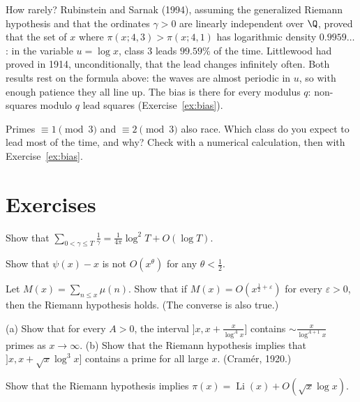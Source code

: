 How rarely? Rubinstein and Sarnak (1994), assuming the generalized Riemann hypothesis and that the ordinates $\gamma>0$ are linearly independent over $\Q$, proved that the set of $x$ where
$\pi(x;4,3)>\pi(x;4,1)$ has logarithmic density $0.9959\ldots$: in the variable $u=\log x$, class $3$ leads $99.59\%$ of the time. Littlewood had proved in 1914, unconditionally, that the lead changes
infinitely often. Both results rest on the formula above: the waves are almost periodic in $u$, so with enough patience they all line up. The bias is there for every modulus $q$: non-squares
modulo $q$ lead squares (Exercise~\ref{ex:bias}).

\begin{think}
Primes $\equiv1\pmod3$ and $\equiv2\pmod3$ also race. Which class do you expect to lead most of the time, and why? Check with a numerical calculation, then with Exercise~\ref{ex:bias}.
\end{think}

\section{Exercises}

\begin{exercise}[$\star$]\label{ex:sumgamma}
Show that $\sum_{0<\gamma\le T}\frac1\gamma=\frac1{4\pi}\log^2T+O(\log T)$.
\end{exercise}

\begin{exercise}[$\star$]\label{ex:omegahalf}
Show that $\psi(x)-x$ is not $O(x^\theta)$ for any $\theta<\frac12$.
\end{exercise}

\begin{exercise}[$\star$]\label{ex:mertensRH}
Let $M(x)=\sum_{n\le x}\mu(n)$. Show that if $M(x)=O(x^{\frac12+\varepsilon})$ for every $\varepsilon>0$, then the Riemann hypothesis holds. (The converse is also true.)
\end{exercise}

\begin{exercise}[$\star\star$]\label{ex:shortprime}
(a) Show that for every $A>0$, the interval $\bigl]x,x+\frac x{\log^Ax}\bigr]$ contains $\sim\frac x{\log^{A+1}x}$ primes as $x\to\infty$.
(b) Show that the Riemann hypothesis implies that $]x,x+\sqrt x\log^3x]$ contains a prime for all large $x$. (Cramér, 1920.)
\end{exercise}

\begin{exercise}[$\star\star$]\label{ex:vonkoch}
Show that the Riemann hypothesis implies $\pi(x)=\operatorname{Li}(x)+O(\sqrt x\log x)$.
\end{exercise}


